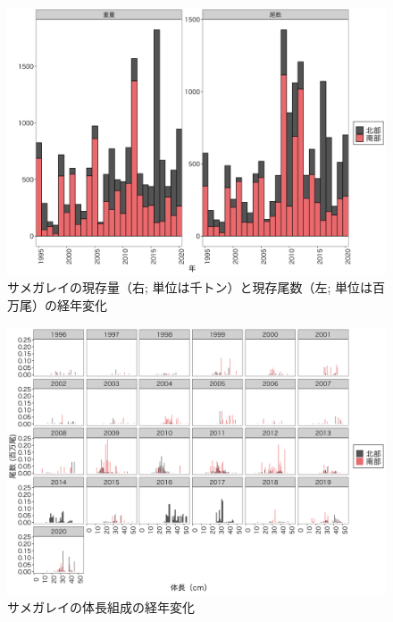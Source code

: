 \documentclass[11pt]{article} %
\begin{document}
\begin{linenumbers}
\begin{figure}[h]
  \centering
  \includegraphics[width = 14cm]{サメガレイtrend.png}
  \caption{サメガレイの現存量（右; 単位は千トン）と現存尾数（左; 単位は百万尾）の経年変化}
\end{figure}

\begin{figure}[h]
  \centering
  \includegraphics[width = 14cm]{サメガレイlength.png}
  \caption{サメガレイの体長組成の経年変化}
\end{figure}


\end{linenumbers}
\end{document}
